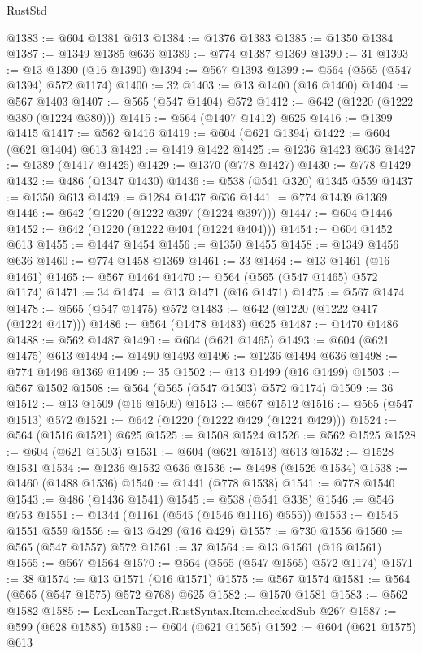 \begin{lexlean}{RustStd}
\begin{coremodule}
{\begin{coremodule}
{{{{{{{{{{{{{@1383 := @604 @1381 @613
@1384 := @1376 @1383
@1385 := @1350 @1384
@1387 := @1349 @1385 @636
@1389 := @774 @1387 @1369
@1390 := 31
@1393 := @13 @1390 (@16 @1390)
@1394 := @567 @1393
@1399 := @564 (@565 (@547 @1394) @572 @1174)
@1400 := 32
@1403 := @13 @1400 (@16 @1400)
@1404 := @567 @1403
@1407 := @565 (@547 @1404) @572
@1412 := @642 (@1220 (@1222 @380 (@1224 @380)))
@1415 := @564 (@1407 @1412) @625
@1416 := @1399 @1415
@1417 := @562 @1416
@1419 := @604 (@621 @1394)
@1422 := @604 (@621 @1404) @613
@1423 := @1419 @1422
@1425 := @1236 @1423 @636
@1427 := @1389 (@1417 @1425)
@1429 := @1370 (@778 @1427)
@1430 := @778 @1429
@1432 := @486 (@1347 @1430)
@1436 := @538 (@541 @320) @1345 @559
@1437 := @1350 @613
@1439 := @1284 @1437 @636
@1441 := @774 @1439 @1369
@1446 := @642 (@1220 (@1222 @397 (@1224 @397)))
@1447 := @604 @1446
@1452 := @642 (@1220 (@1222 @404 (@1224 @404)))
@1454 := @604 @1452 @613
@1455 := @1447 @1454
@1456 := @1350 @1455
@1458 := @1349 @1456 @636
@1460 := @774 @1458 @1369
@1461 := 33
@1464 := @13 @1461 (@16 @1461)
@1465 := @567 @1464
@1470 := @564 (@565 (@547 @1465) @572 @1174)
@1471 := 34
@1474 := @13 @1471 (@16 @1471)
@1475 := @567 @1474
@1478 := @565 (@547 @1475) @572
@1483 := @642 (@1220 (@1222 @417 (@1224 @417)))
@1486 := @564 (@1478 @1483) @625
@1487 := @1470 @1486
@1488 := @562 @1487
@1490 := @604 (@621 @1465)
@1493 := @604 (@621 @1475) @613
@1494 := @1490 @1493
@1496 := @1236 @1494 @636
@1498 := @774 @1496 @1369
@1499 := 35
@1502 := @13 @1499 (@16 @1499)
@1503 := @567 @1502
@1508 := @564 (@565 (@547 @1503) @572 @1174)
@1509 := 36
@1512 := @13 @1509 (@16 @1509)
@1513 := @567 @1512
@1516 := @565 (@547 @1513) @572
@1521 := @642 (@1220 (@1222 @429 (@1224 @429)))
@1524 := @564 (@1516 @1521) @625
@1525 := @1508 @1524
@1526 := @562 @1525
@1528 := @604 (@621 @1503)
@1531 := @604 (@621 @1513) @613
@1532 := @1528 @1531
@1534 := @1236 @1532 @636
@1536 := @1498 (@1526 @1534)
@1538 := @1460 (@1488 @1536)
@1540 := @1441 (@778 @1538)
@1541 := @778 @1540
@1543 := @486 (@1436 @1541)
@1545 := @538 (@541 @338)
@1546 := @546 @753
@1551 := @1344 (@1161 (@545 (@1546 @1116) @555))
@1553 := @1545 @1551 @559
@1556 := @13 @429 (@16 @429)
@1557 := @730 @1556
@1560 := @565 (@547 @1557) @572
@1561 := 37
@1564 := @13 @1561 (@16 @1561)
@1565 := @567 @1564
@1570 := @564 (@565 (@547 @1565) @572 @1174)
@1571 := 38
@1574 := @13 @1571 (@16 @1571)
@1575 := @567 @1574
@1581 := @564 (@565 (@547 @1575) @572 @768) @625
@1582 := @1570 @1581
@1583 := @562 @1582
@1585 := LexLeanTarget.RustSyntax.Item.checkedSub @267
@1587 := @599 (@628 @1585)
@1589 := @604 (@621 @1565)
@1592 := @604 (@621 @1575) @613
}}}}}}}}}}}}}
\end{coremodule}}
\end{coremodule}
\end{lexlean}
